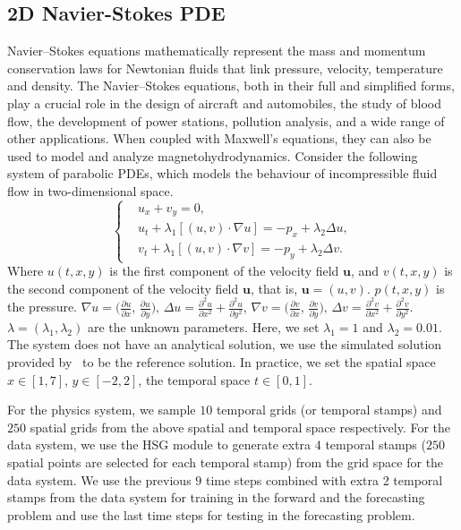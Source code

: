 \documentclass[preprint,11pt]{elsarticle}
\begin{document}
\subsection{2D Navier-Stokes PDE}
Navier–Stokes equations mathematically represent the mass and momentum conservation laws for Newtonian fluids that link pressure, velocity, temperature and density. The Navier–Stokes equations, both in their full and simplified forms, play a crucial role in the design of aircraft and automobiles, the study of blood flow, the development of power stations, pollution analysis, and a wide range of other applications. When coupled with Maxwell's equations, they can also be used to model and analyze magnetohydrodynamics. Consider the following system of parabolic PDEs, which models the behaviour of incompressible fluid flow in two-dimensional space.
\begin{equation}\left\{
\begin{aligned}
&u_{x}+v_{y}=0,\\ 
    &u_t + \lambda_1 [(u ,v) \cdot \nabla u]  = - p_x + \lambda_2 \Delta u,  \\
    &v_t + \lambda_1 [(u,v) \cdot \nabla v] = - p_y + \lambda_2 \Delta v.
\end{aligned}\right.
\end{equation}
Where $u(t,x,y)$ is the first component of the velocity field $\boldsymbol{u}$, and $v(t,x,y)$ is the second component of the velocity field $\boldsymbol{u}$, that is, $\boldsymbol{u}=(u,v)$. $p(t,x,y)$ is the pressure. $\nabla u = (\frac{\partial u}{\partial x}$, $\frac{\partial u}{\partial y}), \, \Delta u = \frac{\partial^2 u}{\partial x^2} + \frac{\partial^2 u}{\partial y^2}$, $\nabla v = (\frac{\partial v}{\partial x}$, $\frac{\partial v}{\partial y}), \, \Delta v = \frac{\partial^2 v}{\partial x^2} + \frac{\partial^2 v}{\partial y^2}$. 
$\lambda = (\lambda_1, \lambda_2)$ are the unknown parameters. Here, we set $\lambda_1 = 1$ and $\lambda_2 = 0.01$. The system does not have an analytical solution, we use the simulated solution provided by~\cite{raissi2019physics} to be the reference solution. In practice, we set the spatial space $x \in [1,7]$, $y \in [-2,2]$, the temporal space $t \in [0, 1]$. 

For the physics system, we sample $10$ temporal grids (or temporal stamps) and $250$ spatial grids from the above spatial and temporal space respectively. For the data system, we use the HSG module to generate extra $4$ temporal stamps ($250$ spatial points are selected for each temporal stamp) from the grid space for the data system. We use the previous $9$ time steps combined with extra 2 temporal stamps from the data system for training in the forward and the forecasting problem and use the last time steps for testing in the forecasting problem.
\end{document}
